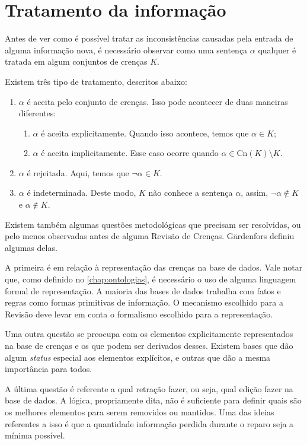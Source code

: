 \section{Tratamento da informação}

Antes de ver como é possível tratar as inconsistências causadas pela entrada de alguma informação nova, é necessário observar como uma sentença $ \alpha $ qualquer é tratada em algum conjuntos de crenças $ K $.

Existem três tipo de tratamento, descritos abaixo:

\begin{enumerate}
	\item $ \alpha $ é aceita pelo conjunto de crenças. Isso pode acontecer de duas maneiras diferentes:
	\begin{enumerate}
		\item $ \alpha $ é aceita explicitamente. Quando isso acontece, temos que $ \alpha \in K $;
		\item $ \alpha $ é aceita implicitamente. Esse caso ocorre quando $ \alpha \in \text{Cn}(K) \setminus K $.
	\end{enumerate}
	\item $ \alpha $ é rejeitada. Aqui, temos que $ \lnot \alpha \in K $. 
	\item $ \alpha $ é indeterminada. Deste modo, $ K $ não conhece a sentença $ \alpha $, assim, $ \lnot \alpha \notin K $ e $ \alpha \notin K $.
\end{enumerate}

Existem também algumas questões metodológicas que precisam ser resolvidas, ou pelo menos observadas antes de alguma Revisão de Crenças. Gärdenfors \cite{revisaoGardenfors2} definiu algumas delas.

A primeira é em relação à representação das crenças na base de dados. Vale notar que, como definido no \autoref{chap:ontologias}, é necessário o uso de alguma linguagem formal de representação. A maioria das bases de dados trabalha com fatos e regras como formas primitivas de informação. O mecanismo escolhido para a Revisão deve levar em conta o formalismo escolhido para a representação.

Uma outra questão se preocupa com os elementos explicitamente representados na base de crenças e os que podem ser derivados desses. Existem bases que dão algum \textit{status} especial aos elementos explícitos, e outras que dão a mesma importância para todos. 

A última questão é referente a qual retração fazer, ou seja, qual edição fazer na base de dados. A lógica, propriamente dita, não é suficiente para definir quais são os melhores elementos para serem removidos ou mantidos. Uma das ideias referentes a isso é que a quantidade informação perdida durante o reparo seja a mínima possível. 

